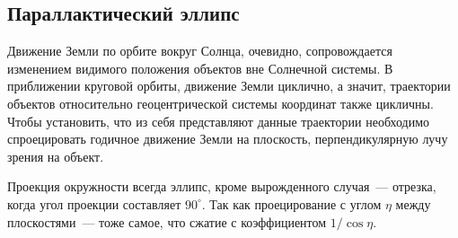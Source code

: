 \subsection{Параллактический эллипс}
Движение Земли по орбите вокруг Солнца, очевидно, сопровождается изменением видимого положения объектов вне Солнечной системы. В приближении круговой орбиты, движение Земли циклично, а значит, траектории объектов относительно геоцентрической системы координат также цикличны. Чтобы установить, что из себя представляют данные траектории необходимо спроецировать годичное движение Земли на плоскость, перпендикулярную лучу зрения на объект.

Проекция окружности всегда эллипс, кроме вырожденного случая~--- отрезка, когда угол проекции составляет $90^\circ$. Так как проецирование с углом $\eta$ между плоскостями~--- тоже самое, что сжатие с коэффициентом $1/\cos\eta$.

